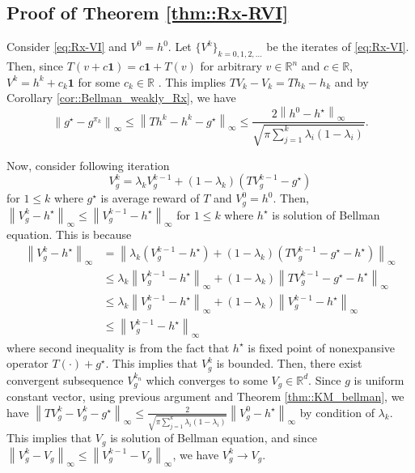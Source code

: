 \documentclass{article} %
\newcommand{\real}{\mathbb{R}}
\newcommand{\reals}{\mathbb{R}}
\newcommand*{\infn}[1]{\left\|{#1}\right\|_{\infty}}
\begin{document}
\subsection{Proof of Theorem \ref{thm::Rx-RVI}}
Consider \ref{eq:Rx-VI} and $V^0=h^0$. Let $\{V^k\}_{k=0, 1,2,\dots}$ be the iterates of \ref{eq:Rx-VI}. Then, since $T(v+c\mathbf{1}) = c\mathbf{1}+T(v)$ for arbitrary $v \in \reals^n$ and $c \in \reals$, $V^{k} = h^{k}+c_k \mathbf{1}$ for some $c_k \in \real$ . This implies $TV_k-V_k = Th_k-h_k$ and by Corollary \ref{cor::Bellman_weakly_Rx}, we have 
\[ \infn{g^{\star}-g^{\pi_k}} \le  \infn{Th^k-h^k -g^{\star}} \le  \frac{2\infn{h^0-h^{\star}}}{\sqrt{\pi\sum^{k}_{j=1} \lambda_i(1-\lambda_{i})}}.\]

  Now, consider following iteration 
  \[ V_g^k  =\lambda_k V_g^{k-1} +(1-\lambda_k)(TV_g^{k-1}-g^{\star}) \]
  for $1 \le k$ where $g^{\star}$ is average reward of $T$ and $V_g^0=h^0$. Then, $\infn{V_g^{k}-h^{\star}} \le \infn{V_g^{k-1}-h^{\star}}$ for $1 \le k$ where $h^{\star}$ is solution of Bellman equation. This is because
  \begin{align*}
      \infn{V_g^{k}-h^{\star}} &= \infn{ \lambda_k (V_g^{k-1}-h^{\star}) +(1-\lambda_k)(TV_g^{k-1}-g^{\star}-h^{\star})}
      \\& \le \lambda_k\infn{V_g^{k-1}-h^{\star}} + (1-\lambda_k)\infn{TV_g^{k-1}-g^{\star}-h^{\star}}
      \\& \le \lambda_k\infn{V_g^{k-1}-h^{\star}} + (1-\lambda_k)\infn{V_g^{k-1}-h^{\star}}
    \\& \le \infn{V_g^{k-1}-h^{\star}}
  \end{align*}
  where second inequality is from the fact that $h^{\star}$ is fixed point of nonexpansive operator $T(\cdot)+g^{\star}$. This implies that $V^k_g$ is bounded. Then, there exist convergent subsequence $V_g^{k_n}$ which converges to some  $V_g \in \real^d $. Since $g$ is uniform constant vector, using previous argument and Theorem \ref{thm::KM_bellman}, we have $\infn{TV_g^k-V_g^k -g^{\star}} \le   \frac{2}{\sqrt{\pi\sum^{k}_{j=1} \lambda_i(1-\lambda_{i})}}\infn{V_g^0-h^{\star}}$ by condition of $\lambda_k$. This implies that $V_g$ is solution of Bellman equation, and since $\infn{V_g^{k}-V_g} \le \infn{V_g^{k-1}-V_g}$, we have $V_g^k \rightarrow V_g$. 
  
\end{document}
